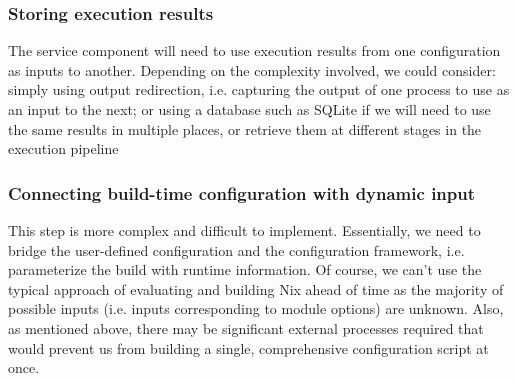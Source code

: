 \documentclass[11pt]{article}
\begin{document}
\subsubsection*{Storing execution results}
\label{sec:org19614a4}
The service component will need to use execution results from one configuration as inputs to another. Depending on the complexity involved, we could consider: simply using output redirection, i.e. capturing the output of one process to use as an input to the next; or using a database such as SQLite if we will need to use the same results in multiple places, or retrieve them at different stages in the execution pipeline
\subsubsection*{Connecting build-time configuration with dynamic input}
\label{sec:org1b0347f}
This step is more complex and difficult to implement. Essentially, we need to bridge the user-defined configuration and the configuration framework, i.e. parameterize the build with runtime information. Of course, we can't use the typical approach of evaluating and building Nix ahead of time as the majority of possible inputs (i.e. inputs corresponding to module options) are unknown. Also, as mentioned above, there may be significant external processes required that would prevent us from building a single, comprehensive configuration script at once.
\end{document}
